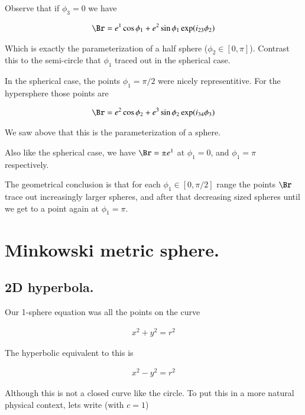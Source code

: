 \documentclass{article}
\begin{document}
\begin{itemize}
Observe that if $\phi_3 = 0$ we have

\begin{align*}
\Br
&= e^1 \cos\phi_1 + e^2 \sin\phi_1 \exp( i_{23} \phi_2 ) \\
\end{align*}

Which is exactly the parameterization of a half sphere ($\phi_2 \in [0,\pi]$).  Contrast this to the semi-circle that $\phi_1$ traced out in the spherical case.  

In the spherical case, the points $\phi_1 = \pi/2$ were nicely representitive.  For the hypersphere those points are

\begin{align*}
\Br &= e^2 \cos\phi_2 + e^3 \sin\phi_2 \exp(i_{34}\phi_3) \\
\end{align*}

We saw above that this is the parameterization of a sphere.

Also like the spherical case, we have $\Br = \pm e^1$ at $\phi_1 = 0$, and $\phi_1 = \pi$ respectively.

The geometrical conclusion is that for each $\phi_1 \in [0,\pi/2]$ range the points $\Br$ trace out increasingly
larger spheres, and after that decreasing sized spheres until we get to a point again at $\phi_1 = \pi$.

\end{itemize}

\section{ Minkowski metric sphere. }

\subsection{ 2D hyperbola. }

Our 1-sphere equation was all the points on the curve

\begin{align*}
x^2 + y^2 = r^2
\end{align*}

The hyperbolic equivalent to this is

\begin{align*}
x^2 - y^2 = r^2
\end{align*}

Although this is not a closed curve like the circle.  To put this in a 
more natural physical context, lets write (with $c=1$)
\end{document}
